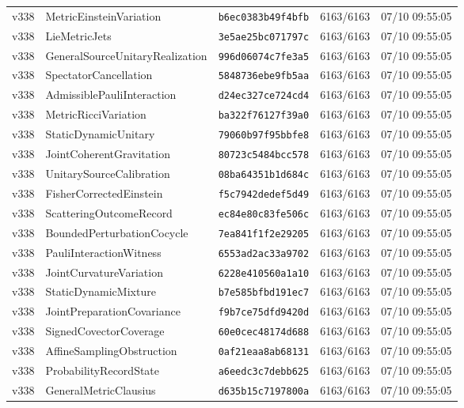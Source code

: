 \documentclass[11pt]{article}
\theoremstyle{definition}\newtheorem{deriv}{Derivação}
\begin{document}
{\begin{longtable}{@{}lllll@{}}
v338 & MetricEinsteinVariation & \texttt{b6ec0383b49f4bfb} & 6163/6163 & 07/10 09:55:05 \\
v338 & LieMetricJets & \texttt{3e5ae25bc071797c} & 6163/6163 & 07/10 09:55:05 \\
v338 & GeneralSourceUnitaryRealization & \texttt{996d06074c7fe3a5} & 6163/6163 & 07/10 09:55:05 \\
v338 & SpectatorCancellation & \texttt{5848736ebe9fb5aa} & 6163/6163 & 07/10 09:55:05 \\
v338 & AdmissiblePauliInteraction & \texttt{d24ec327ce724cd4} & 6163/6163 & 07/10 09:55:05 \\
v338 & MetricRicciVariation & \texttt{ba322f76127f39a0} & 6163/6163 & 07/10 09:55:05 \\
v338 & StaticDynamicUnitary & \texttt{79060b97f95bbfe8} & 6163/6163 & 07/10 09:55:05 \\
v338 & JointCoherentGravitation & \texttt{80723c5484bcc578} & 6163/6163 & 07/10 09:55:05 \\
v338 & UnitarySourceCalibration & \texttt{08ba64351b1d684c} & 6163/6163 & 07/10 09:55:05 \\
v338 & FisherCorrectedEinstein & \texttt{f5c7942dedef5d49} & 6163/6163 & 07/10 09:55:05 \\
v338 & ScatteringOutcomeRecord & \texttt{ec84e80c83fe506c} & 6163/6163 & 07/10 09:55:05 \\
v338 & BoundedPerturbationCocycle & \texttt{7ea841f1f2e29205} & 6163/6163 & 07/10 09:55:05 \\
v338 & PauliInteractionWitness & \texttt{6553ad2ac33a9702} & 6163/6163 & 07/10 09:55:05 \\
v338 & JointCurvatureVariation & \texttt{6228e410560a1a10} & 6163/6163 & 07/10 09:55:05 \\
v338 & StaticDynamicMixture & \texttt{b7e585bfbd191ec7} & 6163/6163 & 07/10 09:55:05 \\
v338 & JointPreparationCovariance & \texttt{f9b7ce75dfd9420d} & 6163/6163 & 07/10 09:55:05 \\
v338 & SignedCovectorCoverage & \texttt{60e0cec48174d688} & 6163/6163 & 07/10 09:55:05 \\
v338 & AffineSamplingObstruction & \texttt{0af21eaa8ab68131} & 6163/6163 & 07/10 09:55:05 \\
v338 & ProbabilityRecordState & \texttt{a6eedc3c7debb625} & 6163/6163 & 07/10 09:55:05 \\
v338 & GeneralMetricClausius & \texttt{d635b15c7197800a} & 6163/6163 & 07/10 09:55:05 \\

\end{longtable}}
\end{document}
